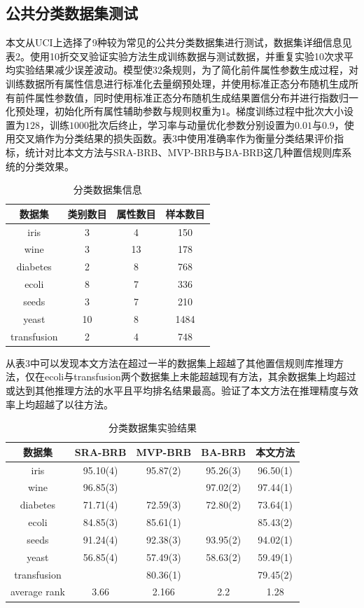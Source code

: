 \documentclass{cjc}
\begin{document}
\subsection{公共分类数据集测试}
本文从UCI上选择了9种较为常见的公共分类数据集进行测试，数据集详细信息见表2。使用10折交叉验证实验方法生成训练数据与测试数据，并重复实验10次求平均实验结果减少误差波动。模型使$32$条规则，为了简化前件属性参数生成过程，对训练数据所有属性信息进行标准化去量纲预处理，并使用标准正态分布随机生成所有前件属性参数值，同时使用标准正态分布随机生成结果置信分布并进行指数归一化预处理，初始化所有属性辅助参数与规则权重为$1$。梯度训练过程中批次大小设置为$128$，训练$1000$批次后终止，学习率与动量优化参数分别设置为$0.01$与$0.9$，使用交叉熵作为分类结果的损失函数。表3中使用准确率作为衡量分类结果评价指标，统计对比本文方法与SRA-BRB\cite{a21}、MVP-BRB\cite{a22}与BA-BRB\cite{a23}这几种置信规则库系统的分类效果。
\begin{table}
	\centering
	\caption{分类数据集信息}
	\begin{tabular}{cccc}
		\toprule
		数据集 & 类别数目 & 属性数目 & 样本数目  \\
		\midrule
		iris & 3 & 4 & 150 \\
		wine & 3 & 13 & 178 \\
		diabetes & 2 & 8 & 768 \\
		ecoli & 8 & 7 & 336 \\
		seeds & 3 & 7 & 210 \\
		yeast & 10 & 8 & 1484 \\
		transfusion & 2 & 4 & 748 \\
		\bottomrule
	\end{tabular}
\end{table}

从表3中可以发现本文方法在超过一半的数据集上超越了其他置信规则库推理方法，仅在ecoli与transfusion两个数据集上未能超越现有方法，其余数据集上均超过或达到其他推理方法的水平且平均排名结果最高。验证了本文方法在推理精度与效率上均超越了以往方法。
\begin{table}
	\centering
	\caption{分类数据集实验结果}
	\small{
	\begin{tabular}{ccccc}
		\toprule
		数据集&SRA-BRB&MVP-BRB&BA-BRB&本文方法\\
		\midrule
		iris&			95.10(4)&	95.87(2)&	95.26(3)&	96.50(1)\\
		wine& 		 	96.85(3)& 		 	& 	97.02(2)& 	97.44(1)\\
		diabetes&	 	71.71(4)&	72.59(3)&	72.80(2)& 	73.64(1)\\
		ecoli& 		 	84.85(3)& 	85.61(1)& 		 	&	85.43(2)\\
		seeds&		 	91.24(4)&  	92.38(3)& 	93.95(2)&	94.02(1)\\
		yeast& 		  	56.85(4)& 	57.49(3)&	58.63(2)&	59.49(1)\\
		transfusion&         	&  	80.36(1)&			&	79.45(2)\\
		\midrule
		average rank&	3.66&		2.166&		2.2&		1.28\\
		\bottomrule
	\end{tabular}}
\end{table}
\end{document}
